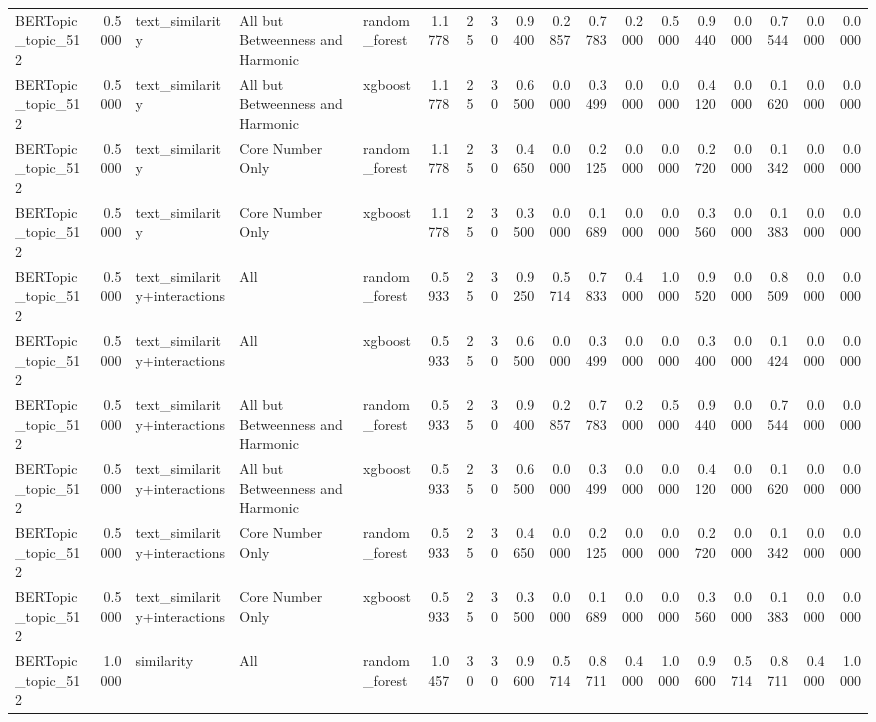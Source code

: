 \begin{tabular}{lrlllrrrrrrrrrrrrr}
BERTopic_topic_512 & 0.5000 & text_similarity & All but Betweenness and Harmonic & random_forest & 1.1778 & 25 & 30 & 0.9400 & 0.2857 & 0.7783 & 0.2000 & 0.5000 & 0.9440 & 0.0000 & 0.7544 & 0.0000 & 0.0000 \\
BERTopic_topic_512 & 0.5000 & text_similarity & All but Betweenness and Harmonic & xgboost & 1.1778 & 25 & 30 & 0.6500 & 0.0000 & 0.3499 & 0.0000 & 0.0000 & 0.4120 & 0.0000 & 0.1620 & 0.0000 & 0.0000 \\
BERTopic_topic_512 & 0.5000 & text_similarity & Core Number Only & random_forest & 1.1778 & 25 & 30 & 0.4650 & 0.0000 & 0.2125 & 0.0000 & 0.0000 & 0.2720 & 0.0000 & 0.1342 & 0.0000 & 0.0000 \\
BERTopic_topic_512 & 0.5000 & text_similarity & Core Number Only & xgboost & 1.1778 & 25 & 30 & 0.3500 & 0.0000 & 0.1689 & 0.0000 & 0.0000 & 0.3560 & 0.0000 & 0.1383 & 0.0000 & 0.0000 \\
BERTopic_topic_512 & 0.5000 & text_similarity+interactions & All & random_forest & 0.5933 & 25 & 30 & 0.9250 & 0.5714 & 0.7833 & 0.4000 & 1.0000 & 0.9520 & 0.0000 & 0.8509 & 0.0000 & 0.0000 \\
BERTopic_topic_512 & 0.5000 & text_similarity+interactions & All & xgboost & 0.5933 & 25 & 30 & 0.6500 & 0.0000 & 0.3499 & 0.0000 & 0.0000 & 0.3400 & 0.0000 & 0.1424 & 0.0000 & 0.0000 \\
BERTopic_topic_512 & 0.5000 & text_similarity+interactions & All but Betweenness and Harmonic & random_forest & 0.5933 & 25 & 30 & 0.9400 & 0.2857 & 0.7783 & 0.2000 & 0.5000 & 0.9440 & 0.0000 & 0.7544 & 0.0000 & 0.0000 \\
BERTopic_topic_512 & 0.5000 & text_similarity+interactions & All but Betweenness and Harmonic & xgboost & 0.5933 & 25 & 30 & 0.6500 & 0.0000 & 0.3499 & 0.0000 & 0.0000 & 0.4120 & 0.0000 & 0.1620 & 0.0000 & 0.0000 \\
BERTopic_topic_512 & 0.5000 & text_similarity+interactions & Core Number Only & random_forest & 0.5933 & 25 & 30 & 0.4650 & 0.0000 & 0.2125 & 0.0000 & 0.0000 & 0.2720 & 0.0000 & 0.1342 & 0.0000 & 0.0000 \\
BERTopic_topic_512 & 0.5000 & text_similarity+interactions & Core Number Only & xgboost & 0.5933 & 25 & 30 & 0.3500 & 0.0000 & 0.1689 & 0.0000 & 0.0000 & 0.3560 & 0.0000 & 0.1383 & 0.0000 & 0.0000 \\
BERTopic_topic_512 & 1.0000 & similarity & All & random_forest & 1.0457 & 30 & 30 & 0.9600 & 0.5714 & 0.8711 & 0.4000 & 1.0000 & 0.9600 & 0.5714 & 0.8711 & 0.4000 & 1.0000 \\

\end{tabular}
